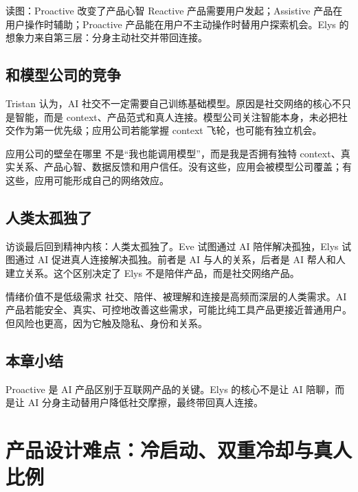 \documentclass[a4paper]{article}
\begin{document}
\begin{knowledgebox}{读图：Proactive 改变了产品心智}
Reactive 产品需要用户发起；Assistive 产品在用户操作时辅助；Proactive 产品能在用户不主动操作时替用户探索机会。Elys 的想象力来自第三层：分身主动社交并带回连接。
\end{knowledgebox}

\subsection{和模型公司的竞争}

Tristan 认为，AI 社交不一定需要自己训练基础模型。原因是社交网络的核心不只是智能，而是 context、产品范式和真人连接。模型公司关注智能本身，未必把社交作为第一优先级；应用公司若能掌握 context 飞轮，也可能有独立机会。

\begin{importantbox}{应用公司的壁垒在哪里}
不是“我也能调用模型”，而是我是否拥有独特 context、真实关系、产品心智、数据反馈和用户信任。没有这些，应用会被模型公司覆盖；有这些，应用可能形成自己的网络效应。
\end{importantbox}

\subsection{人类太孤独了}

访谈最后回到精神内核：人类太孤独了。Eve 试图通过 AI 陪伴解决孤独，Elys 试图通过 AI 促进真人连接解决孤独。前者是 AI 与人的关系，后者是 AI 帮人和人建立关系。这个区别决定了 Elys 不是陪伴产品，而是社交网络产品。

\begin{warningbox}{情绪价值不是低级需求}
社交、陪伴、被理解和连接是高频而深层的人类需求。AI 产品若能安全、真实、可控地改善这些需求，可能比纯工具产品更接近普通用户。但风险也更高，因为它触及隐私、身份和关系。\end{warningbox}

\subsection{本章小结}

Proactive 是 AI 产品区别于互联网产品的关键。Elys 的核心不是让 AI 陪聊，而是让 AI 分身主动替用户降低社交摩擦，最终带回真人连接。


\section{产品设计难点：冷启动、双重冷却与真人比例}
\end{document}
